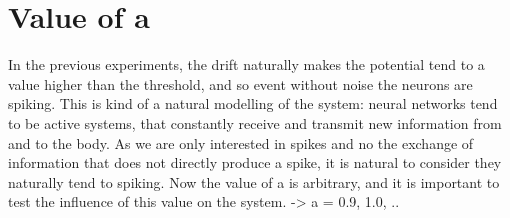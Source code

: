 	\section{Value of a}
	In the previous experiments, the drift naturally makes the potential tend to a value higher than the threshold, and so event without noise the neurons are spiking. This is kind of a natural modelling of the system: neural networks tend to be active systems, that constantly receive and transmit new information from and to the body. As we are only interested in spikes and no the exchange of information that does not directly produce a spike, it is natural to consider they naturally tend to spiking. Now the value of a is arbitrary, and it is important to test the influence of this value on the system. -> a = 0.9, 1.0, ..